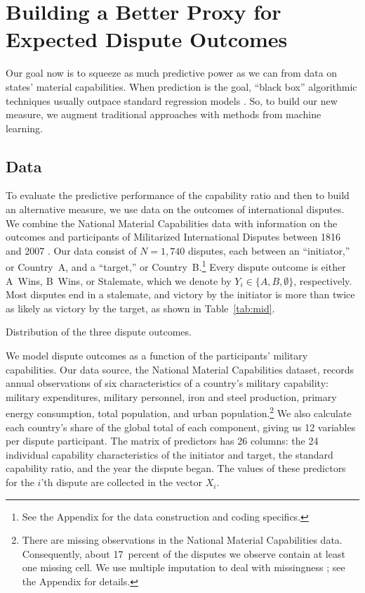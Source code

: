 \section{Building a Better Proxy for Expected Dispute Outcomes}
\label{sec:methods}

Our goal now is to squeeze as much predictive power as we can from data on states' material capabilities.
When prediction is the goal, ``black box'' algorithmic techniques usually outpace standard regression models \citep{Breiman:2001fd}.
So, to build our new measure, we augment traditional approaches with methods from machine learning.

\subsection{Data}

To evaluate the predictive performance of the capability ratio and then to build an alternative measure, we use data on the outcomes of international disputes.
We combine the National Material Capabilities data \citep{singer1972} with information on the outcomes and participants of Militarized International Disputes between 1816 and 2007 \citep{Palmer:2015hp}.
Our data consist of $N = 1{,}740$ disputes, each between an ``initiator,'' or Country~A, and a ``target,'' or Country~B.\footnote{
  See the Appendix for the data construction and coding specifics.
}
Every dispute outcome is either A~Wins, B~Wins, or Stalemate, which we denote by $Y_i \in \{A, B, \emptyset\}$, respectively.
Most disputes end in a stalemate, and victory by the initiator is more than twice as likely as victory by the target, as shown in Table~\ref{tab:mid}.

\begin{table}[htp]
  \centering
  
  \caption{
    Distribution of the three dispute outcomes.
  }
  \label{tab:mid}
\end{table}

We model dispute outcomes as a function of the participants' military capabilities.
Our data source, the National Material Capabilities dataset, records annual observations of six characteristics of a country's military capability: military expenditures, military personnel, iron and steel production, primary energy consumption, total population, and urban population.\footnote{
  There are missing observations in the National Material Capabilities data.
  Consequently, about 17~percent of the disputes we observe contain at least one missing cell.
  We use multiple imputation to deal with missingness \citep{honaker_what_2010}; see the Appendix for details.
}
We also calculate each country's share of the global total of each component, giving us 12 variables per dispute participant.
The matrix of predictors has 26 columns: the 24 individual capability characteristics of the initiator and target, the standard capability ratio, and the year the dispute began.
The values of these predictors for the $i$'th dispute are collected in the vector $X_i$.

